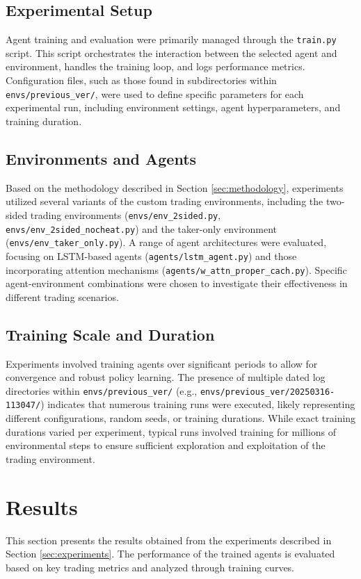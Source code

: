 \documentclass{IEEEtran}
\begin{document}
\subsection{Experimental Setup}
Agent training and evaluation were primarily managed through the \texttt{train.py} script. This script orchestrates the interaction between the selected agent and environment, handles the training loop, and logs performance metrics. Configuration files, such as those found in subdirectories within \texttt{envs/previous\_ver/}, were used to define specific parameters for each experimental run, including environment settings, agent hyperparameters, and training duration.

\subsection{Environments and Agents}
Based on the methodology described in Section \ref{sec:methodology}, experiments utilized several variants of the custom trading environments, including the two-sided trading environments (\texttt{envs/env\_2sided.py}, \texttt{envs/env\_2sided\_nocheat.py}) and the taker-only environment (\texttt{envs/env\_taker\_only.py}). A range of agent architectures were evaluated, focusing on LSTM-based agents (\texttt{agents/lstm\_agent.py}) and those incorporating attention mechanisms (\texttt{agents/w\_attn\_proper\_cach.py}). Specific agent-environment combinations were chosen to investigate their effectiveness in different trading scenarios.

\subsection{Training Scale and Duration}
Experiments involved training agents over significant periods to allow for convergence and robust policy learning. The presence of multiple dated log directories within \texttt{envs/previous\_ver/} (e.g., \texttt{envs/previous\_ver/20250316-113047/}) indicates that numerous training runs were executed, likely representing different configurations, random seeds, or training durations. While exact training durations varied per experiment, typical runs involved training for millions of environmental steps to ensure sufficient exploration and exploitation of the trading environment.

\section{Results}
This section presents the results obtained from the experiments described in Section \ref{sec:experiments}. The performance of the trained agents is evaluated based on key trading metrics and analyzed through training curves.
\end{document}
